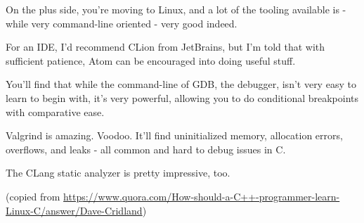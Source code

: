 On the plus side, you’re moving to Linux, and a lot of the tooling available is - while very command-line oriented - very good indeed.

For an IDE, I’d recommend CLion from JetBrains, but I’m told that with sufficient patience, Atom can be encouraged into doing useful stuff.

You’ll find that while the command-line of GDB, the debugger, isn’t very easy to learn to begin with, it’s very powerful, allowing you to do conditional breakpoints with comparative ease.

Valgrind is amazing. Voodoo. It’ll find uninitialized memory, allocation errors, overflows, and leaks - all common and hard to debug issues in C.

The CLang static analyzer is pretty impressive, too.

(copied from
\url{https://www.quora.com/How-should-a-C++-programmer-learn-Linux-C/answer/Dave-Cridland})
